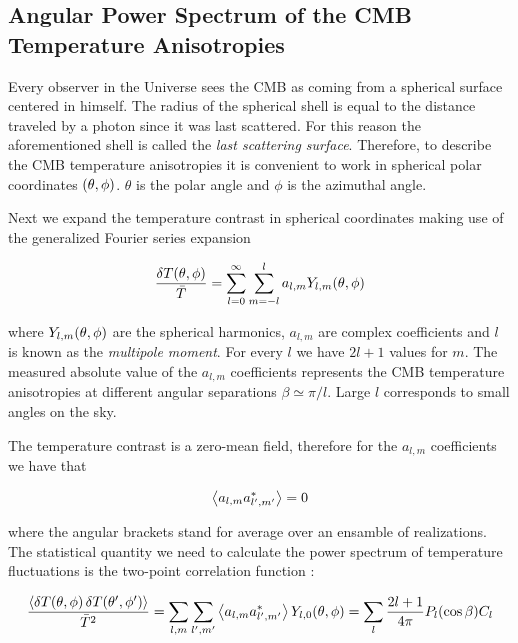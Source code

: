 \subsection{Angular Power Spectrum of the CMB Temperature Anisotropies}

Every observer in the Universe sees the CMB as coming from a spherical
surface centered in himself. The radius of the spherical shell is
equal to the distance traveled by a photon since it was last scattered.
For this reason the aforementioned shell is called the \emph{last
scattering surface}. Therefore, to describe the CMB temperature
anisotropies it is convenient to work in spherical polar
coordinates $\qty(\theta,\phi)$. $\theta$ is the polar angle and $\phi$ is the
azimuthal angle.

Next we expand the temperature contrast in spherical coordinates making use
of the generalized Fourier series expansion

\begin{equation}
        \frac{\var{T\qty(\theta,\phi)}}{\bar T} =
        \sum^\infty_{l=0}\sum^l_{m=-l} a_{l,m}
        Y_{l,m}\qty(\theta,\phi)
\end{equation}

where $Y_{l,m}\qty(\theta,\phi)$ are the spherical harmonics, $a_{l,m}$ are
complex coefficients and $l$ is known as the \emph{multipole moment}.
For every $l$ we have $2l + 1$ values for $m$.
The measured absolute value of the $a_{l,m}$ coefficients represents the
CMB temperature anisotropies at different angular separations $\beta \simeq
\pi/l$. Large $l$ corresponds to small angles on the sky.

The temperature contrast is a zero-mean field, therefore for the $a_{l,m}$
coefficients we have that

\begin{equation}
        \expval{a_{l,m} a^*_{l',m'}} = 0
\end{equation}

where the angular brackets stand for average over an ensamble of
realizations. The statistical quantity we need to calculate the power
spectrum of temperature fluctuations is the two-point correlation function
\autocite{hu2002cosmic}:

\begin{equation}
        \frac{\expval{\var{T\qty(\theta,\phi)} \var{T\qty(\theta',\phi')}}}
        {\bar T^2} =
        \sum_{l,m}\sum_{l',m'} \expval{a_{l,m} a^*_{l',m'}}
        Y_{l,0}\qty(\theta,\phi) =
        \sum_l \frac{2l + 1}{4\pi} P_l\qty(\cos \beta) C_l
\end{equation}


